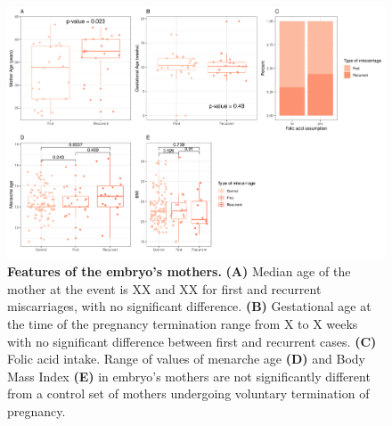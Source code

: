 \documentclass[fleqn,10pt]{wlscirep}
\begin{document}
\begin{figure}[ht]
\centering
\includegraphics[width=\linewidth]{fig/panel_stats.png}
\caption{\textbf{Features of the embryo's mothers.} \textbf{(A)} Median age of the mother at the event is XX and XX for first and recurrent miscarriages, with no significant difference. \textbf{(B)} Gestational age at the time of the pregnancy termination range from X to X weeks with no significant difference between first and recurrent cases.  \textbf{(C)} Folic acid intake. Range of values of menarche age \textbf{(D)} and Body Mass Index \textbf{(E)} in embryo's mothers are not significantly different from a control set of mothers undergoing voluntary termination of pregnancy.}
\label{fig:embryostats}
\end{figure}
\end{document}
